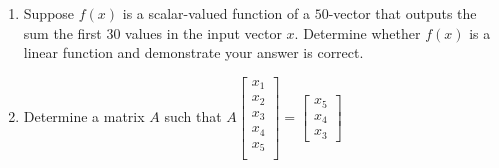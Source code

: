 \documentclass[11pt,fleqn]{article}
\newcommand{\bbm}{\begin{bmatrix}}
\newcommand{\ebm}{\end{bmatrix}}
\begin{document}
\begin{enumerate}
\begin{enumerate}
	\vfill
	\newpage
	\item Suppose $f(x)$ is a scalar-valued function of a $50$-vector that outputs the sum the first 30 values in the input vector $x.$ Determine whether $f(x)$ is a linear function and demonstrate your answer is correct.
	\vfill
	\item Determine a matrix $A$ such that \; $A\bbm x_1\\x_2\\x_3\\x_4\\x_5\\ \ebm = \bbm x_5 \\x_4\\x_3 \ebm$
	\vfill
	\end{enumerate}
\end{enumerate}
\end{document}
